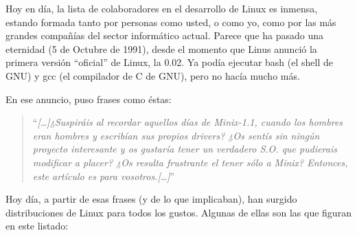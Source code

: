 Hoy en  día, la lista  de colaboradores en  el desarrollo de  Linux es
inmensa, estando  formada tanto  por personas como  usted, o  como yo,
como  por las  más grandes  compañías del  sector informático  actual.
Parece que  ha pasado una eternidad  (5 de Octubre de  1991), desde el
momento que Linus anunció la  primera versión ``oficial'' de Linux, la
0.02. Ya podía ejecutar bash (el shell de GNU) y gcc (el compilador de
C de GNU), pero no hacía mucho más.

En ese anuncio, puso frases como éstas:

\begin{quotation}
``{\em [\dots]¿Suspiráis al  recordar aquellos días de  Minix-1.1, cuando los
hombres eran hombres  y escribían sus propios drivers?  ¿Os sentís sin
ningún proyecto interesante y os  gustaría tener un verdadero S.O. que
pudierais modificar a  placer? ¿Os resulta frustrante el  tener sólo a
Minix? Entonces, este artículo es para vosotros.[\dots]}''
\end{quotation} 

Hoy día, a partir de esas frases (y de lo que implicaban), han surgido
distribuciones de  Linux para todos  los gustos. Algunas de  ellas son
las que figuran en este listado:

